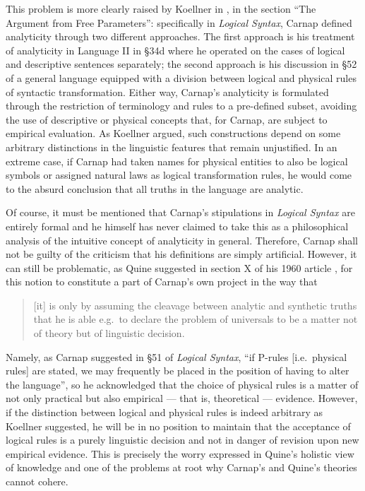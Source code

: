 \documentclass[12pt]{article}
\theoremstyle{plain}
\theoremstyle{definition}
\begin{document}
This problem is more clearly raised by Koellner in \cite{koellner-pluralism}, in the section ``The Argument from Free Parameters'': specifically in \emph{Logical Syntax}, Carnap defined analyticity through two different approaches. The first approach is his treatment of analyticity in Language II in \S 34d where he operated on the cases of logical and descriptive sentences separately; the second approach is his discussion in \S 52 of a general language equipped with a division between logical and physical rules of syntactic transformation. Either way, Carnap's analyticity is formulated through the restriction of terminology and rules to a pre-defined subset, avoiding the use of descriptive or physical concepts that, for Carnap, are subject to empirical evaluation. As Koellner argued, such constructions depend on some arbitrary distinctions in the linguistic features that remain unjustified. In an extreme case, if Carnap had taken names for physical entities to also be logical symbols or assigned natural laws as logical transformation rules, he would come to the absurd conclusion that all truths in the language are analytic.

Of course, it must be mentioned that Carnap's stipulations in \emph{Logical Syntax} are entirely formal and he himself has never claimed to take this as a philosophical analysis of the intuitive concept of analyticity in general. Therefore, Carnap shall not be guilty of the criticism that his definitions are simply artificial. However, it can still be problematic, as Quine suggested in section X of his 1960 article \cite{quine-to-carnap}, for this notion to constitute a part of Carnap's own project in the way that

\begin{quote}
	[it] is only by assuming the cleavage between analytic and synthetic truths that he is able e.g.\ to declare the problem of universals to be a matter not of theory but of linguistic decision.
\end{quote}

Namely, as Carnap suggested in \S 51 of \emph{Logical Syntax}, ``if P-rules [i.e.\ physical rules] are stated, we may frequently be placed in the position of having to alter the language'', so he acknowledged that the choice of physical rules is a matter of not only practical but also empirical --- that is, theoretical --- evidence. However, if the distinction between logical and physical rules is indeed arbitrary as Koellner suggested, he will be in no position to maintain that the acceptance of logical rules is a purely linguistic decision and not in danger of revision upon new empirical evidence. This is precisely the worry expressed in Quine's holistic view of knowledge and one of the problems at root why Carnap's and Quine's theories cannot cohere.
\end{document}
